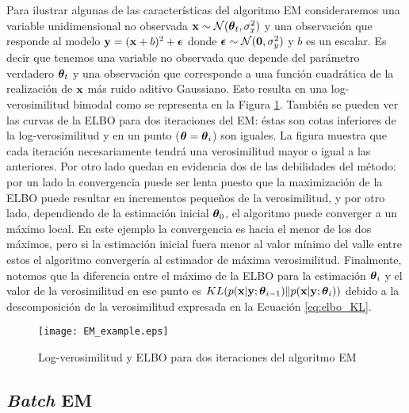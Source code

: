 Para ilustrar algunas de las características del algoritmo EM consideraremos una variable unidimensional no observada $\mathbf{x} \sim \mathcal{N}(\mbox{\boldmath$ \theta $}_t, \sigma_x^2)$ y una observación que responde al modelo $\mathbf{y} = (\mathbf{x} + b)^2 + \mbox{\boldmath$ \epsilon $}$ donde $\mbox{\boldmath$ \epsilon $} \sim \mathcal{N}(\mathbf{0}, \sigma_y^2)$ y $b$ es un escalar. Es decir que tenemos una variable no observada que depende del parámetro verdadero $\mbox{\boldmath$ \theta $}_t$ y una observación que corresponde a una función cuadrática de la realización de $\mathbf{x}$ más ruido aditivo Gaussiano. Esto resulta en una log-verosimilitud bimodal como se representa en la Figura \ref{fig:EM_example}. También se pueden ver las curvas de la ELBO para dos iteraciones del EM: éstas son cotas inferiores de la log-verosimilitud y en un punto ($\mbox{\boldmath$ \theta $} = \mbox{\boldmath$ \theta $}_i$) son iguales. La figura muestra que cada iteración necesariamente tendrá una verosimilitud mayor o igual a las anteriores. Por otro lado quedan en evidencia dos de las debilidades del método: por un lado la convergencia puede ser lenta  puesto que la maximización de la ELBO puede resultar en incrementos pequeños de la verosimilitud, y por otro lado, dependiendo de la estimación inicial $\mbox{\boldmath$ \theta $}_0$, el algoritmo puede converger a un máximo local. En este ejemplo la convergencia es hacia el menor de los dos máximos, pero si la estimación inicial fuera menor al valor mínimo del valle entre estos el algoritmo convergería al estimador de máxima verosimilitud. Finalmente, notemos que la diferencia entre el máximo de la ELBO para la estimación $\mbox{\boldmath$ \theta $}_i$ y el valor de la verosimilitud en ese punto es $KL(p(\mathbf{x} | \mathbf{y}; \mbox{\boldmath$ \theta $}_{i-1}) \rVert p(\mathbf{x} | \mathbf{y}; \mbox{\boldmath$ \theta $}_{i}))$ debido a la descomposición de la verosimilitud expresada en la Ecuación \ref{eq:elbo_KL}.

\begin{figure}[h]
    \centering
    \texttt{[image: EM\_example.eps]}
    \caption{Log-verosimilitud y ELBO para dos iteraciones del algoritmo EM}
    \label{fig:EM_example}
\end{figure}

\subsection{\textit{Batch} EM} \label{sec:batchEM}

